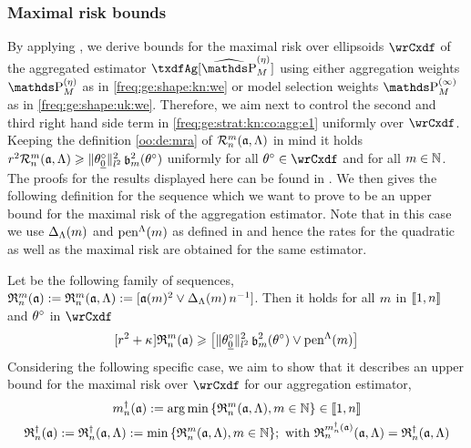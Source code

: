 \subsubsection{Maximal risk bounds}\label{freq:ge:strat:kn:ma}
\begin{te}
  By applying , we derive bounds for the maximal risk over ellipsoids $\rwCxdf$ of the aggregated estimator $\txdfAg[{\erWe[]}]$ using either aggregation weights $\rWe[]$ as in \eqref{freq:ge:shape:kn:we} or model selection weights $\msWe[]$ as in \eqref{freq:ge:shape:uk:we}.
  Therefore, we aim next to control the second and third right hand side term in \eqref{freq:ge:strat:kn:co:agg:e1} uniformly over $\rwCxdf$.
  Keeping the definition \eqref{oo:de:mra} of $\dRa{\Di}{\xdfCw[],\Lambda}$ in mind it holds $\xdfCr^2\dRa{\Di}{\xdfCw[],\Lambda} \geq \Vnormlp{\xdf_{\underline{0}}}^2 \bias^2(\xdf)$ uniformly for all $\xdf \in \rwCxdf$ and for all $\Di\in\Nz$.
  The proofs for the results displayed here can be found in .
  We then gives the following definition for the sequence which we want to prove to be an upper bound for the maximal risk of the aggregation estimator.
  Note that in this case we use $\DipenSv$ and $\penSv$ as defined in  and hence the rates for the quadratic as well as the maximal risk are obtained for the same estimator.
  
\begin{de}\label{freq:ge:strat:kn:ma:de:rate}
  Let be the following family of sequences,
  $\daRa{\Di}{(\xdfCw[])}:=\daRa{\Di}{(\xdfCw[],\Lambda)}:=[\xdfCw^2\vee \DipenSv\,\ssY^{-1}]$.
  Then it holds for all $\Di$ in $\nset{1,\ssY}$ and $\xdf$ in $\rwCxdf$
  \begin{equation}\label{freq:ge:strat:kn:ma:de:rate:e1}
    [\xdfCr^2+\cpen]\daRa{\Di}{(\xdfCw[])}\geq\big[\Vnormlp{\xdf_{\underline{0}}}^2\bias^2(\xdf)\vee\penSv\big]
\end{equation}
Considering the following specific case, we aim to show that it describes an upper bound for the maximal risk over $\rwCxdf$ for our aggregation estimator,
\begin{multline*}
\aDi{\ssY}(\xdfCw[]):=\argmin\Nset[\Di\in\Nz]{\daRa{\Di}{(\xdfCw[],\Lambda)}}\in\nset{1,\ssY}\\
    \naRa{(\xdfCw[])}:=\naRa{(\xdfCw[],\Lambda)}:=\min\Nset[\Di\in\Nz]{\daRa{\Di}{(\xdfCw[],\Lambda)}}; \text{ with } \daRa{\aDi{\ssY}(\xdfCw[])}{(\xdfCw[],\Lambda)}=\naRa{(\xdfCw[],\Lambda)}
    \end{multline*}
\assEnd
\end{de}

\end{te}
